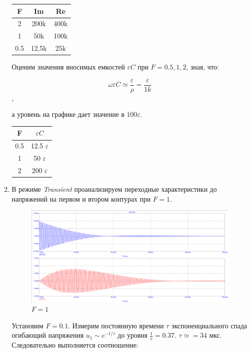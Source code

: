 \documentclass[a4paper, 12pt]{article}%
\begin{document}
\begin{enumerate}
\begin{center}
\begin{tabular}{|c|c|c|}
\hline 
F & Im & Re \\ 
\hline 
2 & 200k & 400k \\ 
\hline 
1 & 50k & 100k \\ 
\hline 
0.5 & 12,5k & 25k \\ 
\hline 
\end{tabular} 
\end{center}

Оценим значения вносимых емкостей $\varepsilon C$ при $F = 0.5,1,2$, зная, что:

\[\omega \varepsilon C \simeq \frac{\varepsilon}{\rho} = \frac{\varepsilon}{1k}\],

а уровень на графике дает значение в $100 \varepsilon$.

\begin{center}
\begin{tabular}{|c|c|}
\hline 
F & $\varepsilon C$ \\ 
\hline 
0.5 & 12.5 $\varepsilon$ \\ 
\hline 
1 & 50 $\varepsilon$\\ 
\hline 
2 & 200 $\varepsilon$\\ 
\hline 
\end{tabular} 
\end{center}

\item В режиме \textit{Transient} проанализируем переходные характеристики до напряжений на первом и втором контурах при $F = 1$.

\begin{figure}[h!]
\centering
\includegraphics[scale = 0.4]{images/plot10_1.png}
\caption{$F = 1$}
\label{fig:Image1}
\end{figure}

Установим $F = 0.1$. Измерим постоянную времени $\tau$ экспоненциального спада огибающий напряжения $u_1 \sim e^{-t/\tau}$ до уровня $\frac{1}{e} = 0.37$. $\tau \simeq = 34$ мкс. Следовательно выполняется соотношение:


\end{enumerate}
\end{document}
